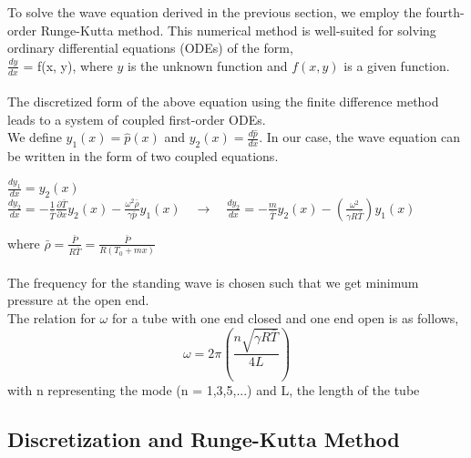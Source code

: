 \documentclass[8pt]{article} %
\begin{document}
To solve the wave equation derived in the previous section, we employ the fourth-order Runge-Kutta method. This numerical method is well-suited for solving ordinary differential equations (ODEs) of the form, \\$\frac{dy}{dx}$ = f(x, y),  where \( y \) is the unknown function and \( f(x, y) \) is a given function.\\\\
The discretized form of the above equation using the finite difference method leads to a system of coupled first-order ODEs.\\
We define \( y_1(x) = \hat{p}(x) \) and \( y_2(x) = \frac{d\hat{p}}{dx} \). In our case, the wave equation can be written in the form of two coupled equations.
\begin{center}
$\frac{dy_1}{dx} = y_2(x)$\\
$\frac{dy_2}{dx} = - \frac{1}{\bar{T}} \frac{\partial \bar{T}}{\partial x} y_2(x) - \frac{\omega^2 \bar{\rho}}{\gamma \bar{p} } y_1(x) \quad \rightarrow \quad \frac{dy_2}{dx}  = - \frac{m}{\bar{T}} y_2(x) -  \left( \frac{\omega^2}{\gamma R \bar{T}}\right)  y_1(x) $ 
\end{center}
where $\bar{\rho} = \frac{\bar{P}}{R \bar{T}} =  \frac{\bar{P}}{R ( T_0 + m x)} $\\\\
The frequency for the standing wave is chosen such that we get minimum pressure at the open end.\\
The relation for $\omega$ for a tube with one end closed and one end open is as follows,
\begin{equation}
\omega = 2 \pi \left( \frac{n \sqrt{\gamma R \bar{T}}}{4 L}\right)
\end{equation}
with n representing the mode (n = 1,3,5,...) and L, the length of the tube\\

\subsection{Discretization and Runge-Kutta Method}
\end{document}

